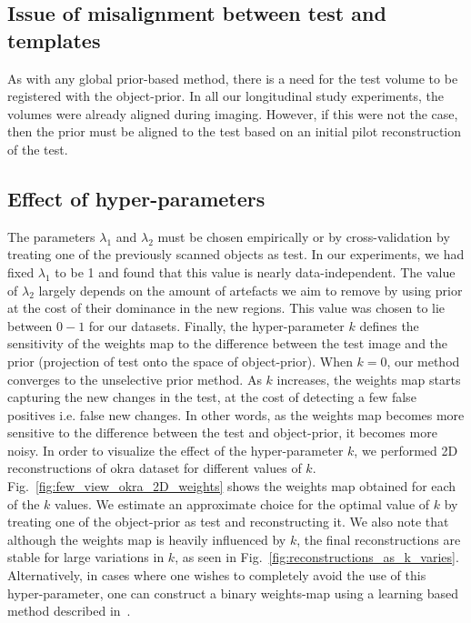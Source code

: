 \documentclass[journal]{IEEEtran}
\begin{document}
\subsection{Issue of misalignment between test and templates}
As with any global prior-based method, there is a need for the test volume to be registered with the object-prior. In all our longitudinal study experiments, the volumes were already aligned during imaging. However, if this were not the case, then the prior must be aligned to the test based on an initial pilot reconstruction of the test.

\subsection{Effect of hyper-parameters}
\label{subsec:k}
The parameters $\lambda_1$ and $\lambda_2$ must be chosen empirically or by cross-validation by treating one of the previously scanned objects as test. In our experiments, we had fixed $\lambda_1$ to be 1 and found that this value is nearly data-independent. The value of $\lambda_2$ largely depends on the amount of artefacts we aim to remove by using prior at the cost of their dominance in the new regions. This value was chosen to lie between $0-1$ for our datasets. Finally, the hyper-parameter $k$ defines the sensitivity of the weights map to the difference between the test image and the prior (projection of test onto the space of object-prior). When $k=0$, our method converges to the unselective prior method. As $k$ increases, the weights map starts capturing the new changes in the test, at the cost of detecting a few false positives i.e. false new changes. In other words, as the weights map becomes more sensitive to the difference between the test and object-prior, it becomes more noisy. In order to visualize the effect of the hyper-parameter $k$, we performed 2D reconstructions of okra dataset for different values of $k$. Fig.~\ref{fig:few_view_okra_2D_weights} shows the weights map obtained for each of the $k$ values. We estimate an approximate choice for the optimal value of $k$ by treating one of the object-prior as test and reconstructing it. We also note that although the weights map is heavily influenced by $k$, the final reconstructions are stable for large variations in $k$, as seen in Fig.~\ref{fig:reconstructions_as_k_varies}. Alternatively, in cases where one wishes to completely avoid the use of this hyper-parameter, one can construct a binary weights-map using a learning based method described in~\cite{supp_paper}.
\end{document}
